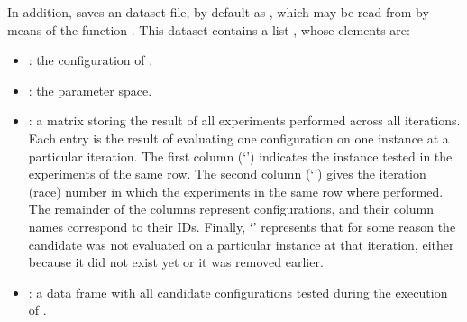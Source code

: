 \documentclass[article,a4paper,nojss,notitle]{jss}
\newcommand{\irace}{\pkg{irace}\xspace}
\newcommand{\SoftwarePackage}{\pkg}
\newcommand{\SPEAR}{\SoftwarePackage{SPEAR}\xspace}
\begin{document}
In addition, \irace saves an  dataset file, by
default as , which may be read from 
by means of the function . This dataset contains a list , whose elements are: 

\begin{itemize}
\item {}: the configuration of \irace.
\item {}: the parameter space.
\item {}: a matrix storing the result of all
  experiments performed across all iterations. Each entry is the
  result of evaluating one configuration on one instance at a
  particular iteration. The first column (`') indicates
  the instance tested in the experiments of the same row.  The second
  column (`') gives the iteration (race) number in
  which the experiments in the same row where performed. The remainder
  of the columns represent configurations, and their column names
  correspond to their IDs. Finally, `' represents that for some
  reason the candidate was not evaluated on a particular instance at
  that iteration, either because it did not exist yet or it was removed
  earlier.
\item {}: a data frame with all candidate
  configurations tested during the execution of \irace.
\end{itemize}



\end{document}
